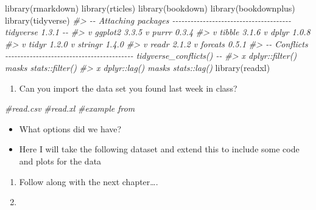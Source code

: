 \documentclass[
]{book}
\newenvironment{Shaded}{\begin{snugshade}}{\end{snugshade}}
\newcommand{\CommentTok}[1]{\textcolor[rgb]{0.56,0.35,0.01}{\textit{#1}}}
\newcommand{\FunctionTok}[1]{\textcolor[rgb]{0.00,0.00,0.00}{#1}}
\newcommand{\NormalTok}[1]{#1}
\providecommand{\tightlist}{%
  \setlength{\itemsep}{0pt}\setlength{\parskip}{0pt}}
\begin{document}
\begin{Shaded}
\begin{Highlighting}[]
\FunctionTok{library}\NormalTok{(rmarkdown)}
\FunctionTok{library}\NormalTok{(rticles)}
\FunctionTok{library}\NormalTok{(bookdown)}
\FunctionTok{library}\NormalTok{(bookdownplus)}
\FunctionTok{library}\NormalTok{(tidyverse)}
\CommentTok{\#\textgreater{} {-}{-} Attaching packages {-}{-}{-}{-}{-}{-}{-}{-}{-}{-}{-}{-}{-}{-}{-}{-}{-}{-}{-}{-}{-}{-}{-}{-}{-}{-}{-}{-}{-}{-}{-}{-}{-}{-}{-}{-}{-}{-}{-} tidyverse 1.3.1 {-}{-}}
\CommentTok{\#\textgreater{} v ggplot2 3.3.5     v purrr   0.3.4}
\CommentTok{\#\textgreater{} v tibble  3.1.6     v dplyr   1.0.8}
\CommentTok{\#\textgreater{} v tidyr   1.2.0     v stringr 1.4.0}
\CommentTok{\#\textgreater{} v readr   2.1.2     v forcats 0.5.1}
\CommentTok{\#\textgreater{} {-}{-} Conflicts {-}{-}{-}{-}{-}{-}{-}{-}{-}{-}{-}{-}{-}{-}{-}{-}{-}{-}{-}{-}{-}{-}{-}{-}{-}{-}{-}{-}{-}{-}{-}{-}{-}{-}{-}{-}{-}{-}{-}{-}{-}{-} tidyverse\_conflicts() {-}{-}}
\CommentTok{\#\textgreater{} x dplyr::filter() masks stats::filter()}
\CommentTok{\#\textgreater{} x dplyr::lag()    masks stats::lag()}
\FunctionTok{library}\NormalTok{(readxl)}
\end{Highlighting}
\end{Shaded}

\begin{enumerate}
\def\labelenumi{\arabic{enumi}.}
\setcounter{enumi}{1}
\tightlist
\item
  Can you import the data set you found last week in class?
\end{enumerate}

\begin{Shaded}
\begin{Highlighting}[]
\CommentTok{\#read.csv}
\CommentTok{\#read.xl}
\CommentTok{\#example from }
\end{Highlighting}
\end{Shaded}

\begin{itemize}
\tightlist
\item
  What options did we have?
\item
  Here I will take the following dataset and extend this to include some code and plots for the data
\end{itemize}

\begin{enumerate}
\def\labelenumi{\arabic{enumi}.}
\setcounter{enumi}{2}
\item
  Follow along with the next chapter\ldots.
\item
\end{enumerate}
\end{document}
